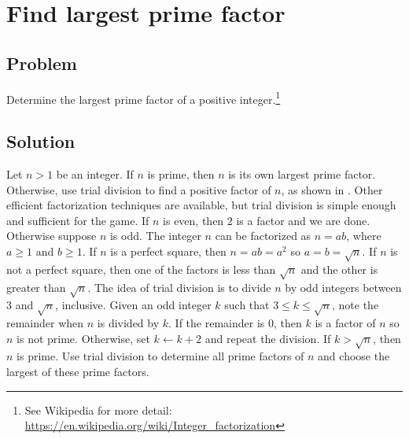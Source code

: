 
\section{Find largest prime factor}



\subsection*{Problem}

Determine the largest prime factor of a positive integer.\footnote{
  See Wikipedia for more detail:
  \url{https://en.wikipedia.org/wiki/Integer_factorization}
}



\subsection*{Solution}

Let $n > 1$ be an integer.  If $n$ is prime, then $n$ is its own
largest prime factor.  Otherwise, use trial division to find a
positive factor of $n$, as shown in .
Other efficient factorization techniques are available, but trial
division is simple enough and sufficient for the game.  If $n$ is
even, then $2$ is a factor and we are done. Otherwise suppose $n$ is
odd.  The integer $n$ can be factorized as $n = ab$, where $a \geq 1$
and $b \geq 1$.  If $n$ is a perfect square, then $n = ab = a^2$ so
$a = b = \sqrt{n}$.  If $n$ is not a perfect square, then one of the
factors is less than $\sqrt{n}$ and the other is greater than
$\sqrt{n}$.  The idea of trial division is to divide $n$ by odd
integers between $3$ and $\sqrt{n}$, inclusive.  Given an odd integer
$k$ such that $3 \leq k \leq \sqrt{n}$, note the remainder when $n$ is
divided by $k$.  If the remainder is $0$, then $k$ is a factor of $n$
so $n$ is not prime.  Otherwise, set $k \gets k + 2$ and repeat the
division.  If $k > \sqrt{n}$, then $n$ is prime.  Use trial division
to determine all prime factors of $n$ and choose the largest of these
prime factors.

\begin{algorithm}[!htbp]

\caption{%
  Determine a factor of an integer.
}
\label{alg:prime:factor}
\end{algorithm}
